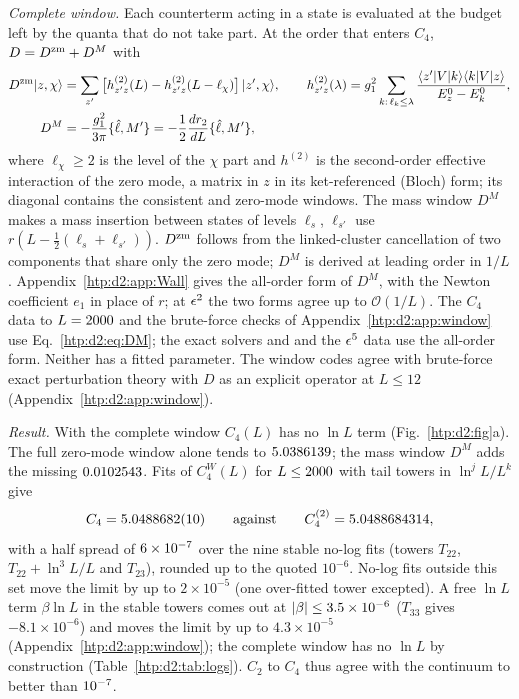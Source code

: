 \emph{Complete window.} Each counterterm acting in a state is evaluated at the budget left by the quanta that do not take
part. At the order that enters $C_4$, $D=D^{\rm zm}+D^M$ with
\begin{align}
 D^{\rm zm}|z,\chi\rangle&=\sum_{z'}\big[h^{(2)}_{z'z}(L)-h^{(2)}_{z'z}(L-\ell_\chi)\big]\,|z',\chi\rangle,\qquad
 h^{(2)}_{z'z}(\lambda)=g_1^2\sum_{k:\,\ell_k\le \lambda}\frac{\langle z'|V|k\rangle\langle k|V|z\rangle}{E^0_z-E^0_k},\label{htp:d2:eq:Dzm}\\
 D^M&=-\frac{g_1^2}{3\pi}\{\hat\ell,M'\}=-\frac12\frac{dr_2}{dL}\{\hat\ell,M'\} ,\label{htp:d2:eq:DM}
\end{align}
where $\ell_\chi\ge2$ is the level of the $\chi$ part and $h^{(2)}$ is the second-order effective interaction of the zero mode, a
matrix in $z$ in its ket-referenced (Bloch) form; its diagonal contains the consistent and zero-mode windows. The mass
window $D^M$ makes a mass insertion between states of levels $\ell_s$, $\ell_{s'}$ use $r(L-\frac12(\ell_s+\ell_{s'}))$. $D^{\rm zm}$ follows from
the linked-cluster cancellation of two components that share only the zero mode; $D^M$ is derived at leading order in $1/L$.
Appendix~\ref{htp:d2:app:Wall} gives the all-order form of $D^M$, with the Newton coefficient $e_1$ in place of $r$; at $\epsilon^2$
the two forms agree up to $\mathcal O(1/L)$. The $C_4$ data to $L=2000$ and the brute-force checks of
Appendix~\ref{htp:d2:app:window} use Eq.~\eqref{htp:d2:eq:DM}; the exact solvers  and  and the
$\epsilon^5$ data use the all-order form.
Neither has a fitted parameter. The window codes agree with brute-force exact perturbation theory with $D$ as an explicit
operator at $L\le12$ (Appendix~\ref{htp:d2:app:window}).

\emph{Result.} With the complete window $C_4(L)$ has no $\ln L$ term (Fig.~\ref{htp:d2:fig}a). The full zero-mode window alone
tends to $5.0386139$; the mass window $D^M$ adds the missing $0.0102543$. Fits of $C_4^W(L)$ for
$L\le2000$ with tail towers in $\ln^jL/L^k$ give
\begin{equation}
 C_4=5.0488682(10)\qquad\text{against}\qquad C_4^{(2)}=5.0488684314 ,
 \label{htp:d2:eq:C4}
\end{equation}
with a half spread of $6\times10^{-7}$ over the nine stable no-log fits (towers $T_{22}$, $T_{22}+\ln^3L/L$ and
$T_{23}$), rounded up to the quoted $10^{-6}$. No-log fits outside this set move the limit by up to $2\times10^{-5}$ (one
over-fitted tower excepted). A free $\ln L$ term $\beta\ln L$ in the stable towers comes out at
$|\beta|\le3.5\times10^{-6}$ ($T_{33}$ gives $-8.1\times10^{-6}$) and moves the limit by up to $4.3\times10^{-5}$
(Appendix~\ref{htp:d2:app:window}); the complete window has no $\ln L$ by construction (Table~\ref{htp:d2:tab:logs}). $C_2$ to $C_4$ thus agree
with the continuum to better than $10^{-7}$.


